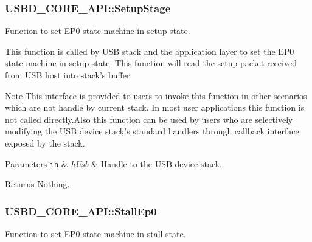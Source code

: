 \begin{DoxyItemize}
\end{DoxyItemize}\hypertarget{structUSBD__CORE__API_abf9196752dcf110a13c44a14b368e4be}{
\subsubsection[{Setup\-Stage}]{ U\-S\-B\-D\-\_\-\-C\-O\-R\-E\-\_\-\-A\-P\-I\-::\-Setup\-Stage}}\label{structUSBD__CORE__API_abf9196752dcf110a13c44a14b368e4be}
Function to set E\-P0 state machine in setup state.

This function is called by U\-S\-B stack and the application layer to set the E\-P0 state machine in setup state. This function will read the setup packet received from U\-S\-B host into stack's buffer. \par
\begin{DoxyNote}{Note}
This interface is provided to users to invoke this function in other scenarios which are not handle by current stack. In most user applications this function is not called directly.\-Also this function can be used by users who are selectively modifying the U\-S\-B device stack's standard handlers through callback interface exposed by the stack.
\end{DoxyNote}

\begin{DoxyParams}[1]{Parameters}
\mbox{\tt in}  & {\em h\-Usb} & Handle to the U\-S\-B device stack. \\
\hline
\end{DoxyParams}
\begin{DoxyReturn}{Returns}
Nothing. 
\end{DoxyReturn}
\hypertarget{structUSBD__CORE__API_a8ee40b044bb1327607dbb4185b2b7c93}{
\subsubsection[{Stall\-Ep0}]{ U\-S\-B\-D\-\_\-\-C\-O\-R\-E\-\_\-\-A\-P\-I\-::\-Stall\-Ep0}}\label{structUSBD__CORE__API_a8ee40b044bb1327607dbb4185b2b7c93}
Function to set E\-P0 state machine in stall state.

